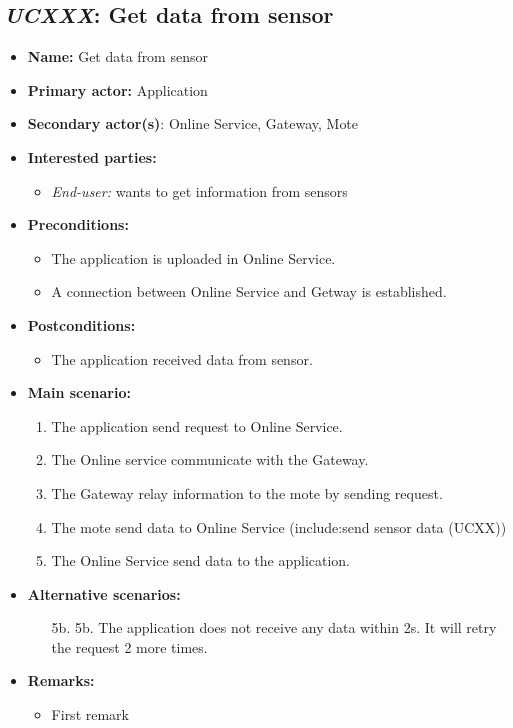 \subsection{\emph{UCXXX}: Get data from sensor}
\begin{itemize}
    \item \textbf{Name:} Get data from sensor
    \item \textbf{Primary actor:} Application
    \item \textbf{Secondary actor(s)}: Online Service, Gateway, Mote
    \item \textbf{Interested parties:}
        \begin{itemize}
            \item \textit{End-user:} wants to get information from sensors
        \end{itemize}

    \item \textbf{Preconditions:}
        \begin{itemize}
            \item The application is uploaded in Online Service.
            \item A connection between Online Service and Getway is established.
        \end{itemize}

    \item \textbf{Postconditions:}
        \begin{itemize}
            \item The application received data from sensor.
        \end{itemize}

    \item \textbf{Main scenario:}
    \begin{enumerate}
       \item The application send request to Online Service.
       \item The Online service communicate with the Gateway.
       \item The Gateway relay information to the mote by sending request.
       \item The mote send data to Online Service (include:send sensor data (UCXX))
       \item The Online Service send data to the application.
    \end{enumerate}

    \item \textbf{Alternative scenarios:}
    \begin{enumerate}
        \item [5b.] 5b. The application does not receive any data within 2s. 
                    It will retry the request 2 more times.
    \end{enumerate}

    \item \textbf{Remarks:}
        \begin{itemize}
            \item First remark
        \end{itemize}
\end{itemize}

